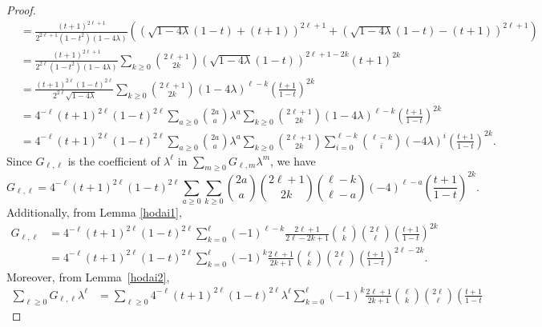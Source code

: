 \documentclass[10pt,a4paper]{amsart}
\begin{document}
\begin{proof}
\[\begin{aligned}
&=
\frac{(t+1)^{2\ell +1}}{2^{2 \ell +1} (1-t^2) (1 - 4 \lambda)}
\left(
\left(
\sqrt{1 - 4 \lambda} (1-t)+(t+1)
\right)^{2\ell+1}
+
\left(
\sqrt{1 - 4 \lambda} (1-t) -(t+1)
\right)^{2\ell+1}\right)\\
&=
\frac{(t+1)^{2\ell +1}}{2^{2 \ell} (1-t^2) (1 - 4 \lambda)}
\sum_{k\ge 0}
\binom{2\ell+1}{2k}
(\sqrt{1 - 4 \lambda} (1-t))^{2\ell+1-2k}
(t+1)^{2k}
\\
&=
\frac{(t+1)^{2\ell} (1-t)^{2\ell} }{2^{2 \ell} \sqrt{1 - 4 \lambda} }
\sum_{k\ge 0}
\binom{2\ell+1}{2k}
(1-4\lambda)^{\ell-k}
\left(
\frac{t+1}{1-t}
\right)
^{2k}
\\
&=
4^{-\ell} (t+1)^{2\ell} (1-t)^{2\ell}\sum_{a \ge 0}
\binom{2a}{a} \lambda^a
\sum_{k\ge 0}
\binom{2\ell+1}{2k}
(1-4\lambda)^{\ell-k}
\left(
\frac{t+1}{1-t}
\right)
^{2k}
\\
&=
4^{-\ell} (t+1)^{2\ell} (1-t)^{2\ell}
\sum_{a \ge 0}
\binom{2a}{a} \lambda^a
\sum_{k\ge 0}
\binom{2\ell+1}{2k}
\sum_{i=0}^{\ell-k}
\binom{\ell-k}{i}
(-4\lambda)^{i}
\left(
\frac{t+1}{1-t}
\right)
^{2k}.
\end{aligned}\]
Since $G_{\ell, \ell}$ is the coefficient of $\lambda^\ell$ in $\sum_{m \ge 0} G_{\ell, m} \lambda^m$,
we have
\[
G_{\ell, \ell} = 
4^{-\ell} (t+1)^{2\ell} (1-t)^{2\ell}\sum_{a \ge 0}
\sum_{k\ge 0}
\binom{2a}{a} 
\binom{2\ell+1}{2k}
\binom{\ell-k}{\ell-a}
(-4)^{\ell-a}
\left(
\frac{t+1}{1-t}
\right)
^{2k}.
\]
Additionally, from Lemma \ref{hodai1}, 
\[\begin{aligned}
G_{\ell, \ell}&=
4^{-\ell} 
(t+1)^{2\ell} (1-t)^{2\ell}
\sum_{k=0}^\ell
(-1)^{\ell-k}
\frac{2\ell+1}{2 \ell -2k+1}
\binom{\ell}{k} \binom{2\ell}{\ell}
\left(
\frac{t+1}{1-t}
\right)
^{2k}\\
&=
4^{-\ell} 
(t+1)^{2\ell} (1-t)^{2\ell}
\sum_{k=0}^\ell
(-1)^{k}
\frac{2\ell+1}{2k+1}
\binom{\ell}{k} \binom{2\ell}{\ell}
\left(
\frac{t+1}{1-t}
\right)
^{2\ell - 2k}.
\end{aligned}\]
Moreover, from Lemma~\ref{hodai2},
\[\begin{aligned}
\sum_{\ell \ge 0} G_{\ell, \ell} \lambda^\ell
&=
\sum_{\ell \ge 0} 4^{-\ell} 
(t+1)^{2\ell} (1-t)^{2\ell}\lambda^\ell
\sum_{k=0}^\ell
(-1)^{k}
\frac{2\ell+1}{2k+1}
\binom{\ell}{k} \binom{2\ell}{\ell}
\left(
\frac{t+1}{1-t}

\end{aligned}\]
\end{proof}
\end{document}
